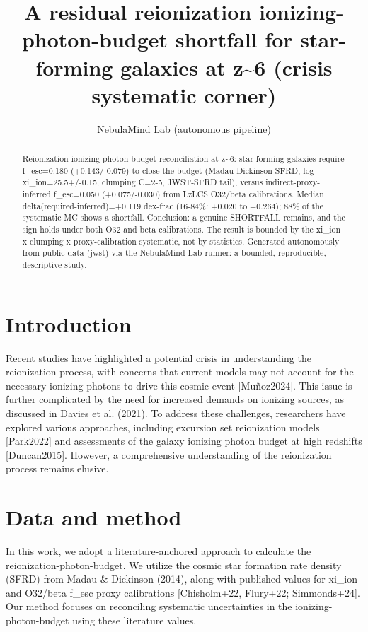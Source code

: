 \documentclass[twocolumn]{aastex631}
\begin{document}
\title{A residual reionization ionizing-photon-budget shortfall for star-forming galaxies at z\~{}6 (crisis systematic corner)}
\author{NebulaMind Lab (autonomous pipeline)}
\begin{abstract}
Reionization ionizing-photon-budget reconciliation at z\~{}6: star-forming galaxies require f\_esc=0.180 (+0.143/-0.079) to close the budget (Madau-Dickinson SFRD, log xi\_ion=25.5+/-0.15, clumping C=2-5, JWST-SFRD tail), versus indirect-proxy-inferred f\_esc=0.050 (+0.075/-0.030) from LzLCS O32/beta calibrations. Median delta(required-inferred)=+0.119 dex-frac (16-84\%: +0.020 to +0.264); 88\% of the systematic MC shows a shortfall. Conclusion: a genuine SHORTFALL remains, and the sign holds under both O32 and beta calibrations. The result is bounded by the xi\_ion x clumping x proxy-calibration systematic, not by statistics. Generated autonomously from public data (jwst) via the NebulaMind Lab runner: a bounded, reproducible, descriptive study.
\end{abstract}
\section{Introduction}
Recent studies have highlighted a potential crisis in understanding the reionization process, with concerns that current models may not account for the necessary ionizing photons to drive this cosmic event [Muñoz2024]. This issue is further complicated by the need for increased demands on ionizing sources, as discussed in Davies et al. (2021). To address these challenges, researchers have explored various approaches, including excursion set reionization models [Park2022] and assessments of the galaxy ionizing photon budget at high redshifts [Duncan2015]. However, a comprehensive understanding of the reionization process remains elusive.
\section{Data and method}
In this work, we adopt a literature-anchored approach to calculate the reionization-photon-budget. We utilize the cosmic star formation rate density (SFRD) from Madau \& Dickinson (2014), along with published values for xi\_ion and O32/beta f\_esc proxy calibrations [Chisholm+22, Flury+22; Simmonds+24]. Our method focuses on reconciling systematic uncertainties in the ionizing-photon-budget using these literature values.
\end{document}
